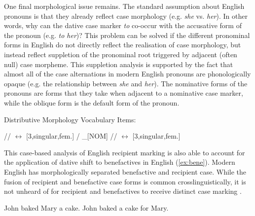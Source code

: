 One final morphological issue remains. The standard assumption about English pronouns is that they already reflect case morphology (e.g. \textit{she} vs. \textit{her}). In other words, why can the dative case marker \textit{to} co-occur with the accusative form of the pronoun (e.g. \textit{to her})? This problem can be solved if the different pronominal forms in English do not directly reflect the realisation of case morphology, but instead reflect suppletion of the pronominal root triggered by adjacent (often null) case morpheme. This suppletion analysis is supported by the fact that almost all of the case alternations in modern English pronouns are phonologically opaque (e.g. the relationship between \textit{she} and \textit{her}). The nominative forms of the pronouns are forms that they take when adjacent to a nominative case marker, while the oblique form is the default form of the pronoun.
\begin{exe}
\ex Distributive Morphology \citep{Halle.1993} Vocabulary Items:
\begin{xlist}
\ex // $\leftrightarrow$ [3,singular,fem.] / \_[NOM]
\ex // $\leftrightarrow$ [3,singular,fem.]
\end{xlist}
\end{exe}%
This case-based analysis of English recipient marking is also able to account for the application of dative shift to benefactives in English (\ref{ex:bene}). Modern English has morphologically separated benefactive and recipient case. While the fusion of recipient and benefactive case forms is common crosslinguistically, it is not unheard of for recipient and benefactives to receive distinct case marking \citep{Zuniga.2010c}.
\begin{exe}
\ex \label{ex:bene}
\begin{xlist}
\ex John baked Mary a cake.
\ex John baked a cake for Mary.
\end{xlist}
\end{exe}
